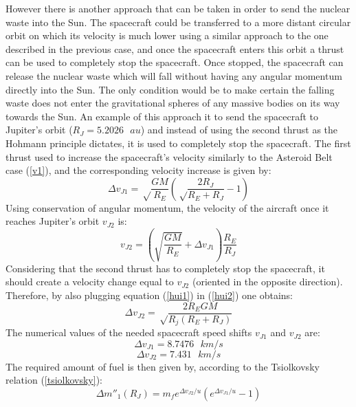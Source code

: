 \documentclass[onecolumn,12pt]{article}
\numberwithin{equation}{section}
\begin{document}
However there is another approach that can be taken in order to send the nuclear waste into the Sun. The spacecraft could be transferred to a more distant circular orbit on which its velocity is much lower using a similar approach to the one described in the previous case, and once the spacecraft enters this orbit a thrust can be used to completely stop the spacecraft. Once stopped, the spacecraft can release the nuclear waste which will fall without having any angular momentum directly into the Sun. The only condition would be to make certain the falling waste does not enter the gravitational spheres of any massive bodies on its way towards the Sun. An example of this approach it to send the spacecraft to Jupiter's orbit ($R_J = 5.2026 \text{ }au$) and instead of using the second thrust as the Hohmann principle dictates, it is used to completely stop the spacecraft. The first thrust used to increase the spacecraft's velocity similarly to the Asteroid Belt case (\ref{v1}), and the corresponding velocity increase is given by:
\begin{equation}
    \Delta v_{J1} = \sqrt\frac{GM}{R_E}\left( \sqrt\frac{2R_J}{R_E+R_J}-1\right)
    \label{hui1}
\end{equation}
Using conservation of angular momentum, the velocity of the aircraft once it reaches Jupiter's orbit $v_{J2}$ is:
\begin{equation}
    v_{J2} = \left(\sqrt{\frac{GM}{R_E}} + \Delta v_{J1}\right) \frac{R_E}{R_J}
    \label{hui2}
\end{equation}
Considering that the second thrust has to completely stop the spacecraft, it should create a velocity change equal to $v_{J2}$ (oriented in the opposite direction). Therefore, by also plugging equation (\ref{hui1}) in (\ref{hui2}) one obtains:
\begin{equation}
    \Delta v_{J2} = \sqrt\frac{2R_EGM}{R_j(R_E+R_J)}
    \label{hui3}
\end{equation}
The numerical values of the needed spacecraft speed shifts $v_{J1}$ and $v_{J2}$ are:
\begin{equation}
    \Delta v_{J1}= 8.7476 \text{ } km/s
\end{equation}
\begin{equation}
    \Delta v_{J2} = 7.431 \text{ } km/s
\end{equation}
The required amount of fuel is then given by, according to the Tsiolkovsky relation (\ref{tsiolkovsky}):
\begin{equation}
    \Delta m''_1(R_J) = m_f e^{\Delta v_{J2}/u}(e^{\Delta v_{J1}/u}-1)
\end{equation}
\end{document}
